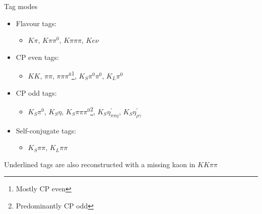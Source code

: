 \documentclass{beamer}
\begin{document}
\renewcommand*{\thefootnote}{\fnsymbol{footnote}}
\begin{frame}{Tag modes}
  \begin{itemize}
    \setlength\itemsep{1.0em}
    \item{Flavour tags:}
    \begin{itemize}
      \item{$K\pi$, $K\pi\pi^0$, $K\pi\pi\pi$, $Ke\nu$}
    \end{itemize}
    \item{CP even tags:}
    \begin{itemize}
      \item{\underline{$KK$}, $\pi\pi$, \underline{$\pi\pi\pi^0$}\footnote{Mostly CP even}, $K_S\pi^0\pi^0$, $K_L\pi^0$}
    \end{itemize}
    \item{CP odd tags:}
    \begin{itemize}
      \item{\underline{$K_S\pi^0$}, $K_S\eta$, $K_S\pi\pi\pi^0$\footnote{Predominantly CP odd}, $K_S\eta^\prime_{\pi\pi\eta}$, $K_S\eta^\prime_{\rho\gamma}$}
    \end{itemize}
    \item{Self-conjugate tags:}
    \begin{itemize}
      \item{\underline{$K_S\pi\pi$}, $K_L\pi\pi$}
    \end{itemize}
  \end{itemize}
  \vspace{0.5cm}
  Underlined tags are also reconstructed with a missing kaon in $KK\pi\pi$
\end{frame}
\end{document}

